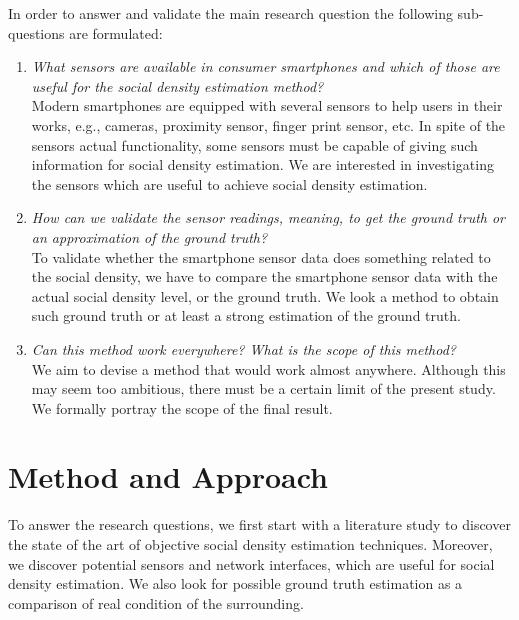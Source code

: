 In order to answer and validate the main research question the following sub-questions are formulated:
\begin{enumerate}
	\item \textit{What sensors are available in consumer smartphones and which of those are useful for the social density estimation method?}\\
	Modern smartphones are equipped with several sensors to help users in their works, e.g., cameras, proximity sensor, finger print sensor, etc. In spite of the sensors actual functionality, some sensors must be capable of giving such information for social density estimation. We are interested in investigating the sensors which are useful to achieve social density estimation.

	\item \textit{How can we validate the sensor readings, meaning, to get the ground truth or an approximation of the ground truth?}\\
	To validate whether the smartphone sensor data does something related to the social density, we have to compare the smartphone sensor data with the actual social density level, or the ground truth. We look a method to obtain such ground truth or at least a strong estimation of the ground truth.


	\item \textit{Can this method work everywhere? What is the scope of this method?}\\
	We aim to devise a method that would work almost anywhere. Although this may seem too ambitious, there must be a certain limit of the present study. We formally portray the scope of the final result.
\end{enumerate}


	\section{Method and Approach} %
	\label{sec:method_and_approach}
	To answer the research questions, we first start with a literature study to discover the state of the art of objective social density estimation techniques. Moreover, we discover potential sensors and network interfaces, which are useful for social density estimation. We also look for possible ground truth estimation as a comparison of real condition of the surrounding.

